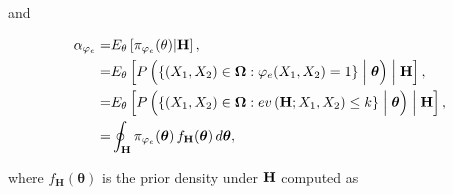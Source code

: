 \documentclass[AMA,Times1COL]{WileyNJDv5} %
\newcommand{\bX}{\boldsymbol{\mathrm{X}}}
\begin{document}
and

\begin{align}\label{erro1}
\alpha_{\varphi_{e}} = & E_\theta\left[ \pi_{\varphi_{e}}(\theta)\vert \text{\textbf{H}}\right], \nonumber\\ 
 =&E_\theta\left[  P\left(\left\lbrace (X_{1}, X_{2})  \in \boldsymbol{\Omega}:\varphi_{e}(X_{1}, X_{2}) =1 \right\rbrace\Bigm|\boldsymbol{\theta}\right)\Bigm|\text{\textbf{H}}\right],\nonumber\\ 
=&E_\theta\left[ P\left( \left\lbrace (X_{1}, X_{2}) \in \boldsymbol{\Omega}: ev\left(\text{\textbf{H}};X_{1}, X_{2} \right)\leq 
k\right\rbrace \Bigm|\boldsymbol{\theta}\right)\Bigm|\text{\textbf{H}}\right],\nonumber\\
=&\oint_{\textbf{H}} \pi_{\varphi_{e}}(\boldsymbol{\theta}) \,f_{\textbf{H}}(\boldsymbol{\theta}) \,d\boldsymbol{\theta}, 
\end{align}

where $f_{\textbf{H}}(\boldsymbol{\theta})$ is the prior density under $\text{\textbf{H}}$ computed as
\end{document}
